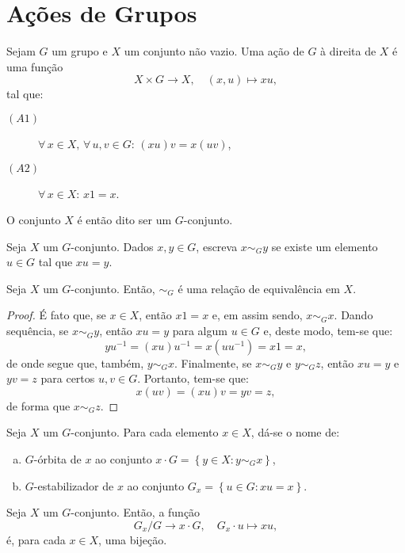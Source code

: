 \section{Ações de Grupos}\label{sec:ações-de-grupos}

\begin{definition}
  Sejam $G$ um grupo e $X$ um conjunto não vazio. Uma ação de $G$ à direita de $X$ é uma função
  \[
    X\times{G}\to{X},\quad{(x,u)\mapsto{xu}},
  \]
  tal que:
  \begin{description}
    \item[$(A1)$] $\forall\,x\in{X},\,\forall\,u,v\in{G}$: $(xu)v=x(uv)$,
    \item[$(A2)$] $\forall\,x\in{X}$: $x1=x$.
  \end{description}
  O conjunto $X$ é então dito ser um $G$-conjunto.
\end{definition}

Seja $X$ um $G$-conjunto. Dados $x,y\in{G}$, escreva $x\sim_{G}{y}$ se existe um elemento $u\in{G}$ tal que $xu=y$.

\begin{proposition}
  Seja $X$ um $G$-conjunto. Então, $\sim_{G}$ é uma relação de equivalência em $X$.
\end{proposition}

\begin{proof}
  É fato que, se $x\in{X}$, então $x1=x$ e, em assim sendo, $x\sim_{G}x$. Dando sequência, se $x\sim_{G}y$, então $xu=y$ para algum $u\in{G}$ e, deste modo, tem-se que:
  \[
    yu^{-1}=(xu)u^{-1}=x(uu^{-1})=x1=x,
  \]
  de onde segue que, também, $y\sim_{G}x$. Finalmente, se $x\sim_{G}y$ e $y\sim_{G}z$, então $xu=y$ e $yv=z$ para certos $u,v\in{G}$. Portanto, tem-se que:
  \[
    x(uv)=(xu)v=yv=z,
  \]
  de forma que $x\sim_{G}z$.
\end{proof}

\begin{definition}
  Seja $X$ um $G$-conjunto. Para cada elemento $x\in{X}$, dá-se o nome de:
  \begin{enumerate}[a)]
    \item $G$-órbita de $x$ ao conjunto $x\cdot{G}=\left\{y\in{X}:y\sim_{G}x\right\}$,
    \item $G$-estabilizador de $x$ ao conjunto $G_{x}=\left\{u\in{G}:xu=x\right\}$.
  \end{enumerate}
\end{definition}

\begin{proposition}
  Seja $X$ um $G$-conjunto. Então, a função
  \[
    G_{x}/G\to{x\cdot{G}},\quad{G_{x}\cdot{u}\mapsto{xu}},
  \]
  é, para cada $x\in{X}$, uma bijeção.
\end{proposition}

